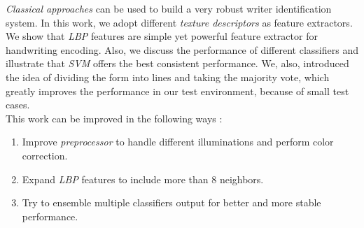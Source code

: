 \emph{Classical approaches} can be used to build a very robust writer identification system. In this work, we adopt different \emph{texture descriptors} as feature extractors. We show that \emph{LBP} features are simple yet powerful feature extractor for handwriting encoding. Also, we discuss the performance of different classifiers and illustrate that \emph{SVM} offers the best consistent performance. We, also, introduced the idea of dividing the form into lines and taking the majority vote, which greatly improves the performance in our test environment, because of small test cases. \\
This work can be improved in the following ways :
\begin{enumerate}
    \item Improve \emph{preprocessor} to handle different illuminations and perform color correction.
    \item Expand \emph{LBP} features to include more than $8$ neighbors.
    \item Try to ensemble multiple classifiers output for better and more stable performance.
\end{enumerate}
